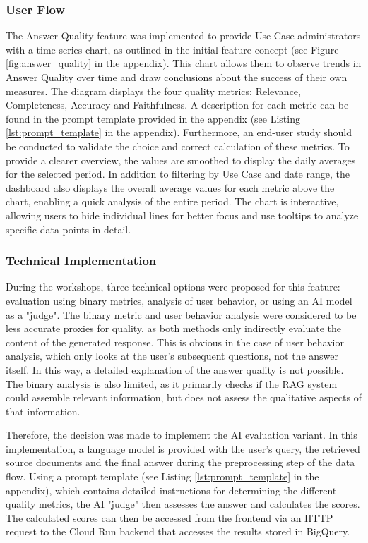 \documentclass[
	english,
	ruledheaders=section,%
	class=report,%
	thesis={type=bachelor},%
	accentcolor=1b,%
	custommargins=true,%
	marginpar=false,%
	parskip=half-,%
	fontsize=11pt,%
	DIV=14,
]{tudapub}
\begin{document}
\subsubsection{User Flow}
The Answer Quality feature was implemented to provide Use Case administrators with a time-series chart, as outlined in the initial feature concept (see Figure \ref{fig:answer_quality} in the appendix). This chart allows them to observe trends in Answer Quality over time and draw conclusions about the success of their own measures. The diagram displays the four quality metrics: Relevance, Completeness, Accuracy and Faithfulness. A description for each metric can be found in the prompt template provided in the appendix (see Listing \ref{lst:prompt_template} in the appendix). Furthermore, an end-user study should be conducted to validate the choice and correct calculation of these metrics. To provide a clearer overview, the values are smoothed to display the daily averages for the selected period. In addition to filtering by Use Case and date range, the dashboard also displays the overall average values for each metric above the chart, enabling a quick analysis of the entire period. The chart is interactive, allowing users to hide individual lines for better focus and use tooltips to analyze specific data points in detail.
\subsubsection{Technical Implementation}
During the workshops, three technical options were proposed for this feature: evaluation using binary metrics, analysis of user behavior, or using an AI model as a "judge". The binary metric and user behavior analysis were considered to be less accurate proxies for quality, as both methods only indirectly evaluate the content of the generated response. This is obvious in the case of user behavior analysis, which only looks at the user's subsequent questions, not the answer itself. In this way, a detailed explanation of the answer quality is not possible. The binary analysis is also limited, as it primarily checks if the RAG system could assemble relevant information, but does not assess the qualitative aspects of that information.

Therefore, the decision was made to implement the AI evaluation variant. In this implementation, a language model is provided with the user's query, the retrieved source documents and the final answer during the preprocessing step of the data flow. Using a prompt template (see Listing \ref{lst:prompt_template} in the appendix), which contains detailed instructions for determining the different quality metrics, the AI "judge" then assesses the answer and calculates the scores. The calculated scores can then be accessed from the frontend via an HTTP request to the Cloud Run backend that accesses the results stored in BigQuery.
\end{document}
